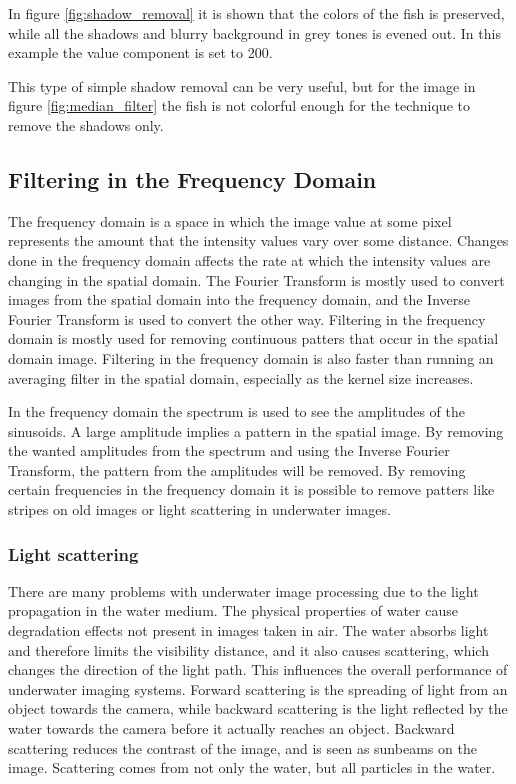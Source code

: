 In figure \ref{fig:shadow_removal} it is shown that the colors of the fish is preserved, while all the shadows and blurry background in grey tones is evened out. In this example the value component is set to 200.

This type of simple shadow removal can be very useful, but for the image in figure \ref{fig:median_filter} the fish is not colorful enough for the technique to remove the shadows only.




\subsection{Filtering in the Frequency Domain}

The frequency domain is a space in which the image value at some pixel represents the amount that the intensity values vary over some distance. Changes done in the frequency domain affects the rate at which the intensity values are changing in the spatial domain. 
The Fourier Transform is mostly used to convert images from the spatial domain into the frequency domain, and the Inverse Fourier Transform is used to convert the other way. 
Filtering in the frequency domain is mostly used for removing continuous patters that occur in the spatial domain image.
Filtering in the frequency domain is also faster than running an averaging filter in the spatial domain, especially as the kernel size increases. 

In the frequency domain the spectrum is used to see the amplitudes of the sinusoids. A large amplitude implies a pattern in the spatial image. By removing the wanted amplitudes from the spectrum and using the Inverse Fourier Transform, the pattern from the amplitudes will be removed.
By removing certain frequencies in the frequency domain it is possible to remove patters like stripes on old images or light scattering in underwater images.


\subsubsection{Light scattering}
There are many problems with underwater image processing due to the light propagation in the water medium. The physical properties of water cause degradation effects not present in images taken in air. The water absorbs light and therefore limits the visibility distance, and it also causes scattering, which changes the direction of the light path. This influences the overall performance of underwater imaging systems. Forward scattering is the spreading of light from an object towards the camera, while backward scattering is the light reflected by the water towards the camera before it actually reaches an object. Backward scattering reduces the contrast of the image, and is seen as sunbeams on the image. Scattering comes from not only the water, but all particles in the water. \cite{article:underwater_image_processing}

